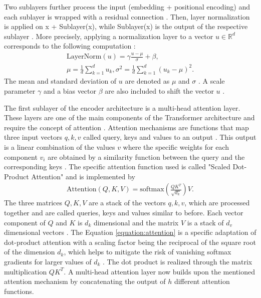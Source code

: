 \par
Two sublayers further process the input (embedding + positional encoding) and each sublayer is wrapped with a residual connection \citep{He2016}.
Then, layer normalization \citep{Ba2016} is applied on x + Sublayer(x), while Sublayer(x) is the output of the respective sublayer \citep{Vaswani2017}.
More precisely, applying a normalization layer to a vector $u\in \mathbb{R}^d$ corresponds to the following computation \citep{Ba2016,Xiong2020}:
\begin{align}
	\text{LayerNorm}(u) = \gamma \frac{u-\mu}{\sigma}+\beta,\\
	\mu = \frac{1}{d}\sum_{k=1}^{d}u_k, \sigma^2 = \frac{1}{d}\sum_{k=1}^{d}(u_k - \mu)^2.
\end{align}
The mean and standard deviation of $u$ are denoted as $\mu$ and $\sigma$ \citep{Xiong2020}.
A scale parameter $\gamma$ and a bias vector $\beta$ are also included to shift the vector $u$ \citep{Xiong2020}.
\par
The first sublayer of the encoder architecture is a multi-head attention layer.   
These layers are one of the main components of the Transformer architecture and require the concept of attention \citep{Vaswani2017}.
Attention mechanisms are functions that map three input vectors $q,k,v$ called query, keys and values to an output \citep{Vaswani2017}.
This output is a linear combination of the values $v$ where the specific weights for each component $v_i$ are obtained by a similarity function between the query and the corresponding keys \citep{Vaswani2017}.
The specific attention function used is called "Scaled Dot-Product Attention" and is implemented by \citep{Vaswani2017}
\begin{align}
    \text{Attention}(Q,K,V) = \text{softmax}(\frac{QK^T}{\sqrt{d_k}})V.
	\label{equation:attention}
\end{align}
The three matrices $Q,K,V$ are a stack of the vectors $q,k,v$, which are processed together and are called queries, keys and values similar to before.
Each vector component of $Q$ and $K$ is $d_k$ dimensional and the matrix $V$ is a stack of $d_v$ dimensional vectors \citep{Vaswani2017}.
The Equation \ref{equation:attention} is a specific adaptation of dot-product attention with a scaling factor being the reciprocal of the square root of the dimension $d_k$, which helps to mitigate the risk of vanishing softmax gradients for larger values of $d_k$ \citep{Vaswani2017}.
The dot product is realized through the matrix multiplication $QK^T$.
A multi-head attention layer now builds upon the mentioned attention mechanism by concatenating the output of $h$ different attention functions.
